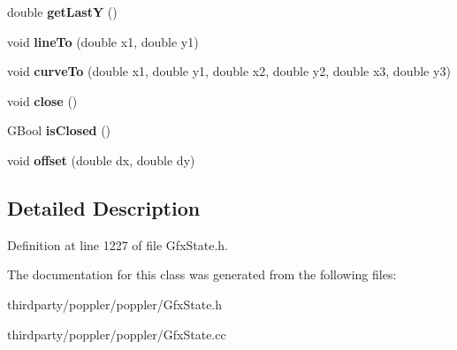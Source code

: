\begin{DoxyCompactItemize}
double {\bfseries get\+LastY} ()
\item 
\mbox{\label{class_gfx_subpath_aa5086bccc76c7d69dca4379feaaef360}} 
void {\bfseries line\+To} (double x1, double y1)
\item 
\mbox{\label{class_gfx_subpath_a0807eccbbd45a526f844f2e2b9cbd3d5}} 
void {\bfseries curve\+To} (double x1, double y1, double x2, double y2, double x3, double y3)
\item 
\mbox{\label{class_gfx_subpath_aeb76079a1f8ddd510f70df9937676b24}} 
void {\bfseries close} ()
\item 
\mbox{\label{class_gfx_subpath_a5e092cfe5dccf3f2ac324bb8e1349daf}} 
G\+Bool {\bfseries is\+Closed} ()
\item 
\mbox{\label{class_gfx_subpath_a7dab342c32953ee74bcb330ec3ce8deb}} 
void {\bfseries offset} (double dx, double dy)
\end{DoxyCompactItemize}


\subsection{Detailed Description}


Definition at line 1227 of file Gfx\+State.\+h.



The documentation for this class was generated from the following files\+:\begin{DoxyCompactItemize}
\item 
thirdparty/poppler/poppler/Gfx\+State.\+h\item 
thirdparty/poppler/poppler/Gfx\+State.\+cc\end{DoxyCompactItemize}
